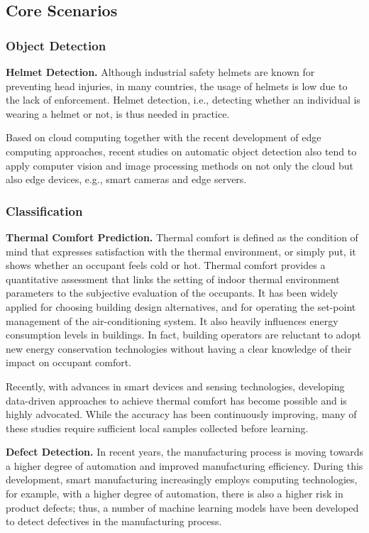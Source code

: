 \subsection{Core Scenarios}

\subsubsection{Object Detection}
\textbf{Helmet Detection.} Although industrial safety helmets are known for preventing head injuries, in many countries, the usage of helmets is low due to the lack of enforcement. Helmet detection, i.e., detecting whether an individual is wearing a helmet or not, is thus needed in practice. 

Based on cloud computing together with the recent development of edge computing approaches, recent studies on automatic object detection also tend to apply computer vision and image processing methods on not only the cloud but also edge devices, e.g., smart cameras and edge servers. 


\subsubsection{Classification}
\textbf{Thermal Comfort Prediction.} Thermal comfort is defined as the condition of mind that expresses satisfaction with the thermal environment, or simply put, it shows whether an occupant feels cold or hot. Thermal comfort provides a quantitative assessment that links the setting of indoor thermal environment parameters to the subjective evaluation of the occupants. It has been widely applied for choosing building design alternatives, and for operating the set-point management of the air-conditioning system. It also heavily influences energy consumption levels in buildings. In fact, building operators are reluctant to adopt new energy conservation technologies without having a clear knowledge of their impact on occupant comfort.

Recently, with advances in smart devices and sensing technologies, developing data-driven approaches to achieve thermal comfort has become possible and is highly advocated. While the accuracy has been continuously improving, many of these studies require sufficient local samples collected before learning.

\vspace{0.2cm} \noindent
\textbf{Defect Detection.} In recent years, the manufacturing process is moving towards a higher degree of automation and improved manufacturing efficiency. During this development, smart manufacturing increasingly employs computing technologies, for example, with a higher degree of automation, there is also a higher risk in product defects; thus, a number of machine learning models have been developed to detect defectives in the manufacturing process.  

